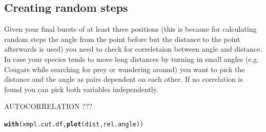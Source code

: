 \documentclass[11pt, a4paper]{article}\usepackage[]{graphicx}\usepackage[]{color}
\makeatletter
\newcommand{\hlstd}[1]{\textcolor[rgb]{0.345,0.345,0.345}{#1}}%
\newcommand{\hlkwd}[1]{\textcolor[rgb]{0.737,0.353,0.396}{\textbf{#1}}}%
\newenvironment{kframe}{%
 \def\at@end@of@kframe{}%
 \ifinner\ifhmode%
  \def\at@end@of@kframe{\end{minipage}}%
  \begin{minipage}{\columnwidth}%
 \fi\fi%
 \def\FrameCommand##1{\hskip\@totalleftmargin \hskip-\fboxsep
 \colorbox{shadecolor}{##1}\hskip-\fboxsep
     \hskip-\linewidth \hskip-\@totalleftmargin \hskip\columnwidth}%
 \MakeFramed {\advance\hsize-\width
   \@totalleftmargin\z@ \linewidth\hsize
   \@setminipage}}%
 {\par\unskip\endMakeFramed%
 \at@end@of@kframe}
\newenvironment{knitrout}{}{} %
\makeatother
\begin{document}
\subsection{Creating random steps}

Given your final bursts of at least three positions (this is because for calculating random steps the angle from the point before but the distance to the point afterwards is used) you need to check for correletaion between angle and distance. In case your species tends to move long distances by turning in small angles (e.g. Cougars while searching for prey or wandering around) you want to pick the distance and the angle as pairs dependent on each other. If no correlation is found you can pick both variables independently.

AUTOCORRELATION ???

\begin{knitrout}
\color{fgcolor}\begin{kframe}


{\ttfamily\noindent\itshape\color{messagecolor}{\#\# Loading required package: adehabitatLT\\\#\# Loading required package: sp\\\#\# Loading required package: ade4\\\#\# Loading required package: adehabitatMA\\\#\# Loading required package: CircStats\\\#\# Loading required package: MASS\\\#\# Loading required package: boot}}

{\ttfamily\noindent\bfseries{}}\end{kframe}
\end{knitrout}

\begin{knitrout}
\color{fgcolor}\begin{kframe}
\begin{alltt}
\hlkwd{with}\hlstd{(xmpl.cut.df,} \hlkwd{plot}\hlstd{(dist, rel.angle))}
\end{alltt}


{\ttfamily\noindent\bfseries\color{errorcolor}{\#\# Error in with(xmpl.cut.df, plot(dist, rel.angle)): Objekt 'xmpl.cut.df' nicht gefunden}}\end{kframe}
\end{knitrout}
\end{document}
